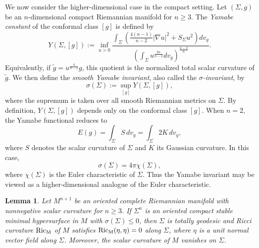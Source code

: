 \documentclass[amssymb,amstex,amsmath,11pt]{article}
\numberwithin{equation}{section}
\theoremstyle{plain}
\newtheorem{lem}[thm]{Lemma}
\theoremstyle{definition}
\theoremstyle{remark}
\begin{document}
\medskip
We now consider the higher-dimensional case in the compact setting. Let $(\Sigma, g)$ be an $n$-dimensional compact Riemannian manifold for $n\geq 3$. The \textit{Yamabe constant} of   the conformal class $[g]$  is defined by
$$
Y(\Sigma,[g]) :=\inf_{u>0} \frac{\int_{\Sigma} \left(\frac{4(n-1)}{n-2}|\nabla u|^2+S_{\Sigma} u^2\right)dv_{g}}{\left(\int_{\Sigma} u^{\frac{2n}{n-2}}dv_{g}\right)^{\frac{n-2}{n}}}.
$$
Equivalently, if $\tilde g=u^{\frac{4}{n-2}}g$, this quotient is the normalized total scalar curvature of $\tilde g$. We then define the \textit{smooth Yamabe invariant}, also called the \textit{$\sigma$-invariant}, by
$$
\sigma(\Sigma):=\sup_{[g]}Y(\Sigma,[g]),
$$
where the supremum is taken over all smooth Riemannian metrics on $\Sigma$.  By definition,  $Y(\Sigma,[g])$ depends only on the conformal class $[g]$. 
When $n=2$, the Yamabe functional reduces to
$$
E(g)=\int_{\Sigma} S\,dv_g=\int_{\Sigma} 2K\,dv_g,
$$
where $S$ denotes the scalar curvature of $\Sigma$ and $K$ its Gaussian curvature. In this case,
$$
\sigma(\Sigma)=4\pi\chi(\Sigma),
$$
where $\chi(\Sigma)$ is the Euler characteristic of $\Sigma$. Thus the Yamabe invariant may be viewed as a higher-dimensional analogue of the Euler characteristic.




\begin{lem}\label{y}
Let $M^{n+1}$ be an oriented  complete Riemannian manifold with nonnegative scalar curvature for $n\ge 3$. If $\Sigma^n$ is an oriented compact stable minimal hypersurface in $M$ with $\sigma(\Sigma)\le 0$, then $\Sigma$ is totally geodesic and Ricci curvature ${\rm Ric_M}$ of $M$ satisfies ${\rm Ric_M}(\eta,\eta)=0$ along $\Sigma$, where $\eta$ is a unit normal vector field along $\Sigma$. Moreover, the scalar curvature of $M$ vanishes on $\Sigma$.
\end{lem}
\end{document}
